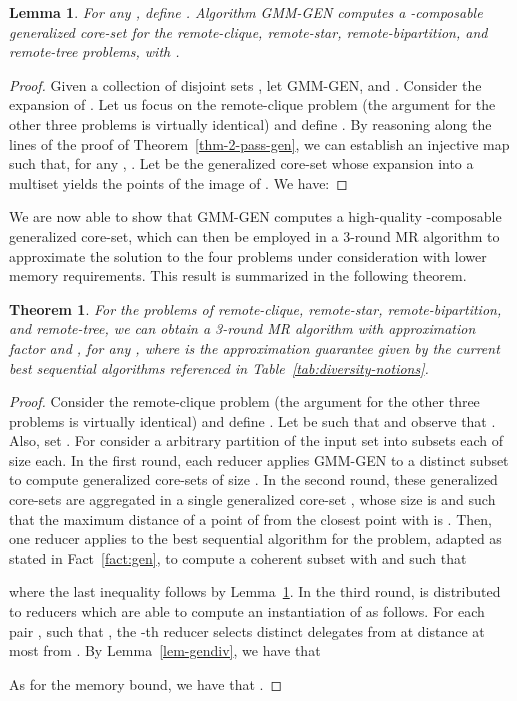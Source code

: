 \documentclass{article}
\newtheorem{theorem}{Theorem}
\newtheorem{lemma}{Lemma}
\begin{document}
\begin{lemma}\label{lem:gmm-gen-core-set}
For any , define .
Algorithm {\sc GMM-GEN} computes a -composable generalized
core-set for the remote-clique, remote-star, remote-bipartition, and
remote-tree problems, with .
\end{lemma}
\begin{proof}
Given a collection of disjoint sets , let 
{\sc GMM-GEN}, and .  Consider
the expansion  of .  Let us focus on the remote-clique
problem (the argument for the other three problems is virtually
identical) and define .  By
reasoning along the lines of the proof of
Theorem~\ref{thm-2-pass-gen}, we can establish an injective map  such that, for any , .  Let  be the generalized
core-set whose expansion into a multiset yields the  points of the
image of . We have:

\end{proof}
We are now able to show that {\sc GMM-GEN}
computes a high-quality -composable generalized core-set, which
can then be employed in a 3-round MR algorithm to approximate the
solution to the four problems under consideration with lower memory
requirements.
This result is summarized in the following theorem.
\begin{theorem}\label{thm:3-rounds-gen}
  For the problems of remote-clique, remote-star, remote-bipartition,
  and remote-tree, we can obtain a 3-round MR algorithm with
  approximation factor  and
  , for any ,
  where  is the approximation guarantee given by the current
  best sequential algorithms referenced in
  Table~\ref{tab:diversity-notions}.
\end{theorem}
\begin{proof}
  Consider the remote-clique problem (the argument for the other three
  problems is virtually identical) and define
  . Let  be such
  that  and observe that
  . Also, set
  .  For 
  consider a arbitrary partition of the input set  into 
  subsets  each of size
   each. In the first round, each reducer
  applies {\sc GMM-GEN} to a distinct subset  to compute
  generalized core-sets of size . In the second round, these
  generalized core-sets are aggregated in a single generalized
  core-set , whose size is  and such
  that the maximum distance of a point of  from the closest point
   with  is
  . Then, one reducer
  applies to  the best sequential algorithm for the problem,
  adapted as stated in Fact~\ref{fact:gen}, to compute a coherent
  subset  with  and such that

where the last inequality follows by Lemma~\ref{lem:gmm-gen-core-set}.
In the third round,  is distributed to  reducers which
are able to compute an instantiation  of  as
follows. For each pair , such that ,
the -th reducer selects  distinct delegates from  at
distance at most  from
. By Lemma~\ref{lem-gendiv}, we have that

As for the memory bound, we have that
.
\end{proof}
\end{document}
